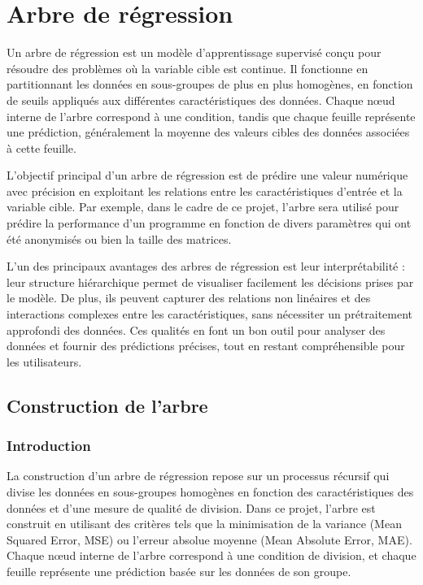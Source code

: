 \documentclass{rapportECL2024}
\begin{document}
\fairepagedegarde
\fairetabledesmatieres


\section{Arbre de régression}


Un arbre de régression est un modèle d'apprentissage supervisé conçu pour résoudre des problèmes où la variable cible est continue. Il fonctionne en partitionnant les données en sous-groupes de plus en plus homogènes, en fonction de seuils appliqués aux différentes caractéristiques des données. Chaque nœud interne de l'arbre correspond à une condition, tandis que chaque feuille représente une prédiction, généralement la moyenne des valeurs cibles des données associées à cette feuille.

L'objectif principal d'un arbre de régression est de prédire une valeur numérique avec précision en exploitant les relations entre les caractéristiques d'entrée et la variable cible. Par exemple, dans le cadre de ce projet, l'arbre sera utilisé pour prédire la performance d'un programme en fonction de divers paramètres qui ont été anonymisés ou bien la taille des matrices.

L'un des principaux avantages des arbres de régression est leur interprétabilité : leur structure hiérarchique permet de visualiser facilement les décisions prises par le modèle. De plus, ils peuvent capturer des relations non linéaires et des interactions complexes entre les caractéristiques, sans nécessiter un prétraitement approfondi des données. Ces qualités en font un bon outil pour analyser des données et fournir des prédictions précises, tout en restant compréhensible pour les utilisateurs.


\subsection{Construction de l'arbre}
\subsubsection{Introduction}
La construction d'un arbre de régression repose sur un processus récursif qui divise les données en sous-groupes homogènes en fonction des caractéristiques des données et d'une mesure de qualité de division. Dans ce projet, l'arbre est construit en utilisant des critères tels que la minimisation de la variance (Mean Squared Error, MSE) ou l'erreur absolue moyenne (Mean Absolute Error, MAE). Chaque nœud interne de l'arbre correspond à une condition de division, et chaque feuille représente une prédiction basée sur les données de son groupe.
\end{document}
